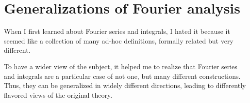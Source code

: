 \section{Generalizations of Fourier analysis}

When I first learned about Fourier series and integrals, I hated it
because it seemed like a collection of many ad-hoc definitions,
formally related but very different.

To have a wider view of the subject, it helped me to realize that
Fourier series and integrals are a particular case of not one,
but many different constructions.  Thus, they can be generalized in
widely different directions, leading to differently flavored views of
the original theory.

\newcommand{\R}{\mathbf{R}}
\newcommand{\Z}{\mathbf{Z}}
\newcommand{\Q}{\mathbf{Q}}
\renewcommand{\C}{\mathbf{C}}
\newcommand{\ud}{\mathrm{d}}


